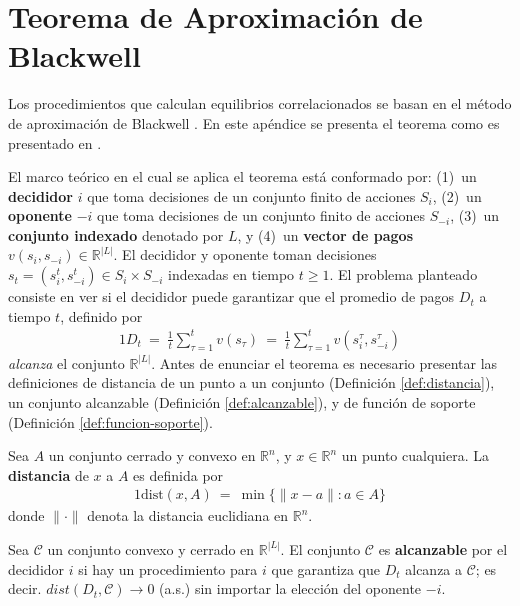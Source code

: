 \chapter{Teorema de Aproximación de Blackwell}
\label{apex:chapter:blackwell}

Los procedimientos que calculan equilibrios correlacionados se basan en el método de aproximación de Blackwell \cite{bib:blackwell}. En este apéndice se presenta el teorema como es presentado en \cite{bib:correlated-equilibrium}.

El marco teórico en el cual se aplica el teorema está conformado por: (1)~un \textbf{decididor} $i$ que toma decisiones de un conjunto finito de acciones $S_i$, (2)~un \textbf{oponente} $-i$ que toma decisiones de un conjunto finito de acciones $S_{-i}$, (3)~un \textbf{conjunto indexado} denotado por $L$, y (4)~un \textbf{vector de pagos} $v(s_i, s_{-i}) \in \mathbb{R}^{|L|}$.
El decididor y oponente toman decisiones $s_t=(s^t_i,s^t_{-i})\in S_i\times S_{-i}$ indexadas en tiempo $t\geq 1$. El problema planteado consiste en ver si el decididor puede garantizar que el promedio de pagos $D_t$ a tiempo $t$, definido por
\begin{alignat}{1}
D_t\ =\ \frac{1}{t}\sum_{\tau=1}^t v(s_\tau)\ =\ \frac{1}{t}\sum_{\tau=1}^t v(s^\tau_i,s^\tau_{-i})
\end{alignat}
\emph{alcanza} el conjunto $\mathbb{R}^{|L|}$. Antes de enunciar el teorema es necesario presentar las definiciones de distancia de un punto a un conjunto (Definición \ref{def:distancia}), un conjunto alcanzable (Definición \ref{def:alcanzable}), y de función de soporte (Definición \ref{def:funcion-soporte}).

\begin{definition}
\label{def:distancia}
Sea $A$ un conjunto cerrado y convexo en $\mathbb{R}^n$, y $x \in \mathbb{R}^n$ un punto cualquiera. La \textbf{distancia} de $x$ a $A$ es definida por
\begin{alignat}{1}
\text{dist}(x, A)\ =\ \min\{ \|x - a\| : a \in A \}
\end{alignat}
donde $\|\cdot\|$ denota la distancia euclidiana en $\mathbb{R}^n$.
\end{definition}

\begin{definition}
\label{def:alcanzable}
Sea $\mathcal{C}$ un conjunto convexo y cerrado en $\mathbb{R}^{|L|}$. El conjunto $\mathcal{C}$ es \textbf{alcanzable} por el decididor $i$ si hay un procedimiento para $i$ que garantiza que $D_t$ alcanza a $\mathcal{C}$; es decir. $dist(D_t, \mathcal{C}) \rightarrow 0$ (a.s.) sin importar la elección del oponente $-i$.
\end{definition}

